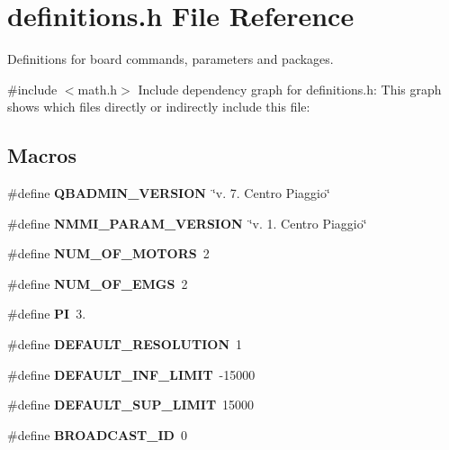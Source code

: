 \section{definitions.\+h File Reference}
\label{definitions_8h}


Definitions for board commands, parameters and packages.  


{\ttfamily \#include $<$math.\+h$>$}\newline
Include dependency graph for definitions.\+h\+:
This graph shows which files directly or indirectly include this file\+:
\subsection*{Macros}
\begin{DoxyCompactItemize}
\item 
\mbox{\label{definitions_8h_a82178bde559e31158313c53e55709f7b}} 
\#define {\bfseries Q\+B\+A\+D\+M\+I\+N\+\_\+\+V\+E\+R\+S\+I\+ON}~\char`\"{}v. 7. Centro Piaggio\char`\"{}
\item 
\mbox{\label{definitions_8h_a2df364f88287df7e654ee05b9422af45}} 
\#define {\bfseries N\+M\+M\+I\+\_\+\+P\+A\+R\+A\+M\+\_\+\+V\+E\+R\+S\+I\+ON}~\char`\"{}v. 1. Centro Piaggio\char`\"{}
\item 
\mbox{\label{definitions_8h_a39ac50737c1ee7d5b723b2597fdf6f26}} 
\#define {\bfseries N\+U\+M\+\_\+\+O\+F\+\_\+\+M\+O\+T\+O\+RS}~2
\item 
\mbox{\label{definitions_8h_a8e55cba7b8d4f9aa1eb36f311ce121e5}} 
\#define {\bfseries N\+U\+M\+\_\+\+O\+F\+\_\+\+E\+M\+GS}~2
\item 
\mbox{\label{definitions_8h_a598a3330b3c21701223ee0ca14316eca}} 
\#define {\bfseries PI}~3.
\item 
\mbox{\label{definitions_8h_a2674041fcb6b33ea03b7441c5bf07da1}} 
\#define {\bfseries D\+E\+F\+A\+U\+L\+T\+\_\+\+R\+E\+S\+O\+L\+U\+T\+I\+ON}~1
\item 
\mbox{\label{definitions_8h_a9df8ee92f567229e4e969a89792f7909}} 
\#define {\bfseries D\+E\+F\+A\+U\+L\+T\+\_\+\+I\+N\+F\+\_\+\+L\+I\+M\+IT}~-\/15000
\item 
\mbox{\label{definitions_8h_a664de08cc70be246edd326c4832574bb}} 
\#define {\bfseries D\+E\+F\+A\+U\+L\+T\+\_\+\+S\+U\+P\+\_\+\+L\+I\+M\+IT}~15000
\item 
\mbox{\label{definitions_8h_ab9fe47395310b34fa1ceb112c9ca10e2}} 
\#define {\bfseries B\+R\+O\+A\+D\+C\+A\+S\+T\+\_\+\+ID}~0
\item 

\end{DoxyCompactItemize}
